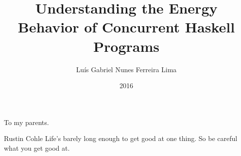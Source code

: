 \documentclass[en,twoside,onehalfspacing,msc]{risethesis}
\title{Understanding the Energy Behavior of Concurrent Haskell Programs}
\date{2016}
\author{Luís Gabriel Nunes Ferreira Lima}
\begin{document}
\frontmatter

\frontpage

\presentationpage

\begin{fichacatalografica}
	\FakeFichaCatalografica %
\end{fichacatalografica}

\banca

\begin{dedicatory}
To my parents.
\end{dedicatory}

\acknowledgements


\begin{epigraph}{Rustin Cohle}
Life's barely long enough to get good at one thing.
\linebreak
So be careful what you get good at.
\end{epigraph}

\resumo


\abstract


\listoffigures

\listoftables

\lstlistoflistings

\listofacronyms


\tableofcontents

\mainmatter









\begin{references}
  
\end{references}

\theappendix

\end{document}
